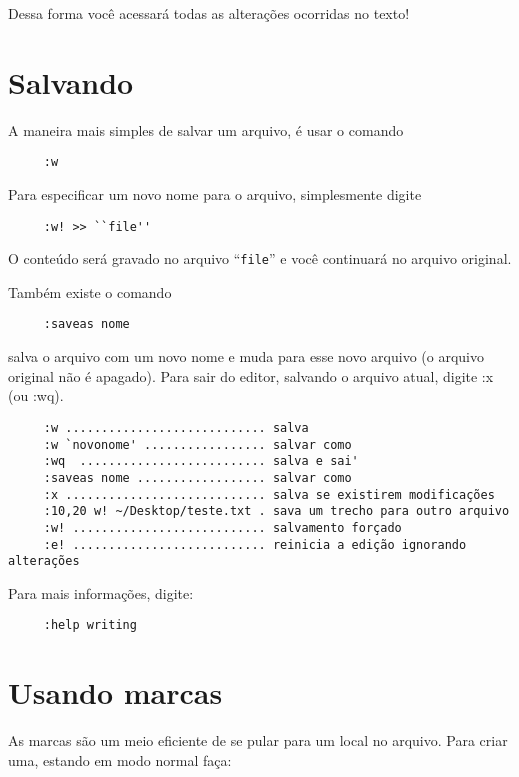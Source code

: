 Dessa forma você acessará todas as alterações ocorridas no texto!

\section{Salvando}

A maneira mais simples de salvar um arquivo, é usar o comando

\begin{verbatim}
     :w
\end{verbatim}


Para especificar um novo nome para o arquivo, simplesmente digite

\begin{verbatim}
     :w! >> ``file''
\end{verbatim}

O conteúdo será gravado no arquivo ``{\tt file}'' e você continuará no arquivo original.

Também existe o comando

\begin{verbatim}
     :saveas nome
\end{verbatim}

salva o arquivo com um novo nome e muda para esse novo arquivo (o arquivo original não é apagado).
Para sair do editor, salvando o arquivo atual, digite :x (ou :wq).

\begin{verbatim}
     :w ............................ salva
     :w `novonome' ................. salvar como
     :wq  .......................... salva e sai'
     :saveas nome .................. salvar como
     :x ............................ salva se existirem modificações
     :10,20 w! ~/Desktop/teste.txt . sava um trecho para outro arquivo
     :w! ........................... salvamento forçado
     :e! ........................... reinicia a edição ignorando alterações
\end{verbatim}

Para mais informações, digite:

\begin{verbatim}
     :help writing
\end{verbatim}

\section{Usando marcas}
\label{sec:Usando marcas}

As marcas são um meio eficiente de se pular para um local no arquivo. Para
criar uma,  estando em modo normal faça:


